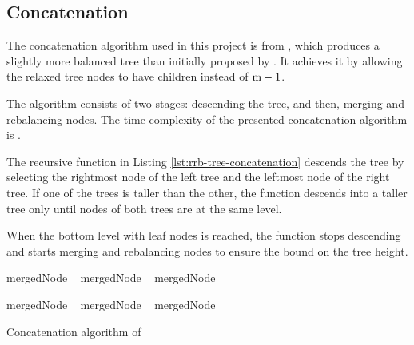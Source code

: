 \subsection{Concatenation}
The concatenation algorithm used in this project is from \cite{rrb-vector-practical-general-purpose-im-sequence}, which produces a slightly more balanced tree than initially proposed by \cite{efficient-immutable-vectors}. It achieves it by allowing the relaxed tree nodes to have \m{} children instead of $\m{} - 1$.

The algorithm consists of two stages: descending the tree, and then, merging and rebalancing nodes. The time complexity of the presented concatenation algorithm is .

The recursive function in Listing \ref{lst:rrb-tree-concatenation} descends the tree by selecting the rightmost node of the left tree and the leftmost node of the right tree. If one of the trees is taller than the other, the function descends into a taller tree only until nodes of both trees are at the same level.

When the bottom level with leaf nodes is reached, the function stops descending and starts merging and rebalancing nodes to ensure the  bound on the tree height.

\begin{listing}[!ht]
    \begin{algorithmic}[1]
                \State mergedNode \la\ 
                \State \Return {}
                \State mergedNode \la\ 
                \State \Return {}
            \Else
                \State mergedNode \la\ \nil{}

                    \State mergedNode \la\ 
                \Else
                        \State mergedNode \la\ 
                    \Else
                        \State mergedNode \la\ 
                    \EndIf
                \EndIf

                \State \Return {}
            \EndIf
        \EndFunction
    \end{algorithmic}

    \caption{Concatenation algorithm of \treerrb{}}
    \label{lst:rrb-tree-concatenation}
\end{listing}

